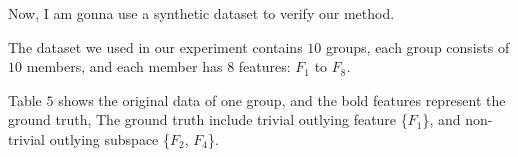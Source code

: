 \documentclass[
 size=14pt,
 paper=smartboard,  %
 mode=present, 		%
 display=slides, 	%
 style=tuliplab,  	%
 pauseslide,
 fleqn,leqno]{powerdot}
\begin{document}

\begin{note}
Now,
I am gonna use a synthetic dataset to verify our method.

The dataset we used in our experiment contains $10$ groups,
each group consists of $10$ members,
and each member has $8$ features: $F_1$ to $F_8$.

Table $5$ shows the original data of one group,
and the bold features represent the ground truth,
The ground truth include trivial outlying feature \{$F_1$\},
and non-trivial outlying subspace \{$F_2$, $F_4$\}.
\end{note}

\end{document}
